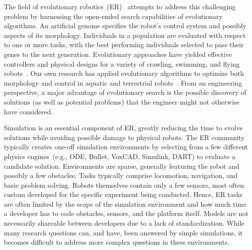 %
The field of evolutionary robotics~(ER)~\cite{Floreano2008} attempts to address this challenging problem
%
by harnessing the open-ended search capabilities of evolutionary algorithms.
An artificial genome specifies the robot's control system and possibly aspects of its morphology.
%
Individuals in a population are evaluated with respect to one or more tasks, with the best performing individuals selected to pass their genes to the next generation.
%
Evolutionary approaches have yielded effective controllers and physical designs for a variety of crawling, swimming, and flying robots~\cite{bongard-lipson, Lipson2000}.  
%
Our own research has applied evolutionary algorithms to optimize both morphology and control
in aquatic and terrestrial robots~\cite{Clark.JournalBB.2015,MooreALIFEJournal}.  
%
From an
engineering perspective, a major advantage of evolutionary search is the possible discovery of solutions (as well as potential problems) that the engineer might not otherwise have considered.

% 
Simulation is an essential component of ER, greatly reducing the time to evolve solutions while avoiding possible damage to physical robots.
%
The ER community typically creates one-off simulation environments by selecting from a few different physics 
engines~(e.g., ODE, Bullet, VoxCAD, Simulink, DART) to evaluate a candidate solution.  
%
Environments are sparse, generally featuring the robot and possibly a few obstacles.  
%
Tasks typically comprise locomotion, navigation, and basic problem solving.
%
%
%
Robots themselves contain only a few sensors, most often custom developed for the specific 
experiment being conducted.  
%
Hence, ER tasks are often limited by the scope of the simulation environment and how much time a developer has to code obstacles, sensors, and the platform itself.  
%
Models are not necessarily shareable between developers due to a lack of standardization.  
%
While many research questions can, and have, been answered by simple simulations, 
it becomes difficult to address more complex questions in these environments.  

